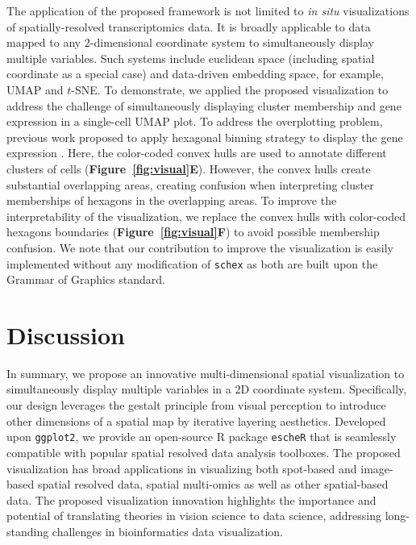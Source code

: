 \documentclass[10pt,twocolumn]{article}
\begin{document}
The application of the proposed framework is not limited to \textit{in situ} visualizations of spatially-resolved transcriptomics data. It is broadly applicable to data mapped to any 2-dimensional coordinate system to simultaneously display multiple variables. Such systems include euclidean space (including spatial coordinate as a special case) and data-driven embedding space, for example, UMAP and $t$-SNE. To demonstrate, we applied the proposed visualization to address the challenge of simultaneously displaying cluster membership and gene expression in a single-cell UMAP plot. To address the overplotting problem, previous work proposed to apply hexagonal binning strategy to display the gene expression \cite{freytag_2020}. Here, the color-coded convex hulls are used to annotate different clusters of cells (\textbf{Figure~\ref{fig:visual}E}). However, the convex hulls create substantial overlapping areas, creating confusion when interpreting cluster memberships of hexagons in the overlapping areas. To improve the interpretability of the visualization, we replace the convex hulls with color-coded hexagons boundaries  (\textbf{Figure~\ref{fig:visual}F}) to avoid possible membership confusion. We note that our contribution to improve the visualization is easily implemented without any modification of \texttt{schex} as both are built upon the Grammar of Graphics \cite{wilkinson_2012} standard.


\section{Discussion}
In summary, we propose an innovative multi-dimensional spatial visualization to simultaneously display multiple variables in a 2D coordinate system. Specifically, our design leverages the gestalt principle from visual perception to introduce other dimensions of a spatial map by iterative layering aesthetics. Developed upon \texttt{ggplot2}, we provide an open-source R package \texttt{escheR} that is seamlessly compatible with popular spatial resolved data analysis toolboxes. The proposed visualization has broad applications in visualizing both spot-based and image-based spatial resolved data, spatial multi-omics as well as other spatial-based data. The proposed visualization innovation highlights the importance and potential of translating theories in vision science to data science, addressing long-standing challenges in bioinformatics data visualization.


\end{document}
